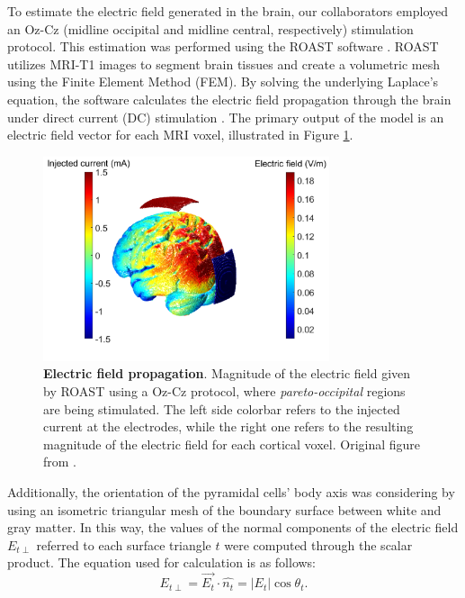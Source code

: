 \documentclass[../main.tex]{subfiles}
\begin{document}
To estimate the electric field generated in the brain, our collaborators employed an Oz-Cz (midline occipital and midline central, respectively) stimulation protocol.
This estimation was performed using the ROAST software \citep{huang2018roast}.
ROAST utilizes MRI-T1 images to segment brain tissues and create a volumetric mesh using the Finite Element Method (FEM).
By solving the underlying Laplace's equation, the software calculates the electric field propagation through the brain under direct current (DC) stimulation \citep{huang2018roast}.
The primary output of the model is an electric field vector for each MRI voxel, illustrated in  Figure \ref{fig:fig1}.
\begin{figure}[htbp]
    \centering
    \includegraphics[width=0.75\textwidth]{chapter3/figures/1.png}
     \caption{\textbf{Electric field propagation}.
     Magnitude of the electric field given by ROAST using a Oz-Cz protocol,
     where \textit{pareto-occipital} regions are being stimulated.
     The left side colorbar refers to the injected current at the electrodes, while  
     the right one refers to the resulting magnitude of the electric field for each cortical voxel.
     Original figure from \citep{cabrera-alvarez_understanding_2023}.}
    \label{fig:fig1}
\end{figure}
\clearpage
Additionally, the orientation of the pyramidal cells' body axis was considering by using an isometric triangular mesh of the boundary surface between white and gray matter.
In this way, the values of the normal components of the electric field $E_{t\perp}$ referred to each surface triangle $t$ were computed through the scalar product.
The equation used for calculation is as follows:
\begin{equation}
    E_{t\perp} = \vec{E_t} \cdot \hat{n_t} = |E_t| \cos{\theta_t}.
    \label{eq:perpendicular-components}
\end{equation}
\end{document}
